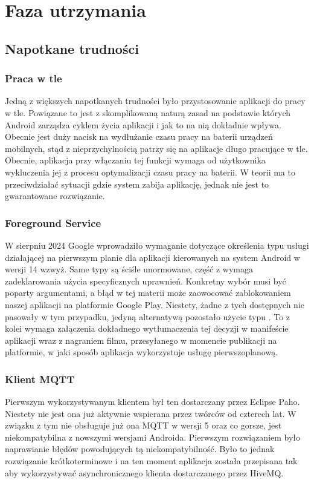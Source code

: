 \section{Faza utrzymania}

\subsection{Napotkane trudności}

\subsubsection{Praca w tle}
Jedną z większych napotkanych trudności było przystosowanie aplikacji do pracy w tle. Powiązane to jest z skomplikowaną naturą zasad na podstawie których Android zarządza cyklem życia aplikacji i jak to na nią dokładnie wpływa. Obecnie jest duży nacisk na wydłużanie czasu pracy na baterii urządzeń mobilnych, stąd z nieprzychylnością patrzy się na aplikacje długo pracujące w tle. Obecnie, aplikacja przy włączaniu tej funkcji wymaga od użytkownika wykluczenia jej z procesu optymalizacji czasu pracy na baterii. W teorii ma to przeciwdziałać sytuacji gdzie system zabija aplikację, jednak nie jest to gwarantowane rozwiązanie. 

\subsubsection{Foreground Service}
W sierpniu 2024 Google wprowadziło wymaganie dotyczące określenia typu usługi działającej na pierwszym planie dla aplikacji kierowanych na system Android w wersji 14 wzwyż. Same typy są ściśle unormowane, część z wymaga zadeklarowania użycia specyficznych uprawnień. Konkretny wybór musi być poparty argumentami, a błąd w tej materii może zaowocować zablokowaniem naszej aplikacji na platformie Google Play. Niestety, żadne z tych dostępnych nie pasowały w tym przypadku, jedyną alternatywą pozostało użycie typu . To z kolei wymaga załączenia dokładnego wytłumaczenia tej decyzji w manifeście aplikacji wraz z nagraniem filmu, przesyłanego w momencie publikacji na platformie, w jaki sposób aplikacja wykorzystuje usługę pierwszoplanową. 

\subsubsection{Klient MQTT}
Pierwszym wykorzystywanym klientem był ten dostarczany przez Eclipse Paho. Niestety nie jest ona już aktywnie wspierana przez twórców od czterech lat. W związku z tym nie obsługuje już ona MQTT w wersji 5 oraz co gorsze, jest niekompatybilna z nowszymi wersjami Androida. Pierwszym rozwiązaniem było naprawianie błędów powodujących tą niekompatybilność. Było to jednak rozwiązanie krótkoterminowe i na ten moment aplikacja została przepisana tak aby wykorzystywać asynchronicznego klienta dostarczanego przez HiveMQ.

